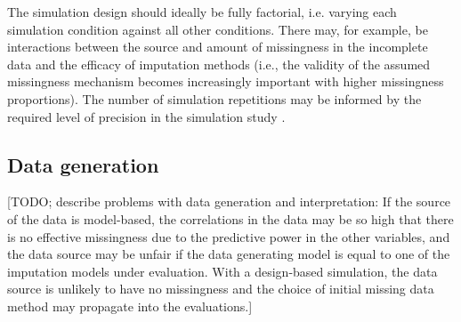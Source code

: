 \documentclass[bimj,fleqn]{w-art}
\begin{document}
The simulation design should ideally be fully factorial, i.e. varying each simulation condition against all other conditions. There may, for example, be interactions between the source and amount of missingness in the incomplete data and the efficacy of imputation methods (i.e., the validity of the assumed missingness mechanism becomes increasingly important with higher missingness proportions). The number of simulation repetitions may be informed by the required level of precision in the simulation study \citep[e.g. as determined from a maximum tolerable level of uncertainty in terms of a performance measure's Monte Carlo error][]{morr18}. 



\subsection{Data generation}


[TODO; describe problems with data generation and interpretation: If the source of the data is model-based, the correlations in the data may be so high that there is no effective missingness due to the predictive power in the other variables, and the data source may be unfair if the data generating model is equal to one of the imputation models under evaluation. With a design-based simulation, the data source is unlikely to have no missingness and the choice of initial missing data method may propagate into the evaluations.]
\end{document}

